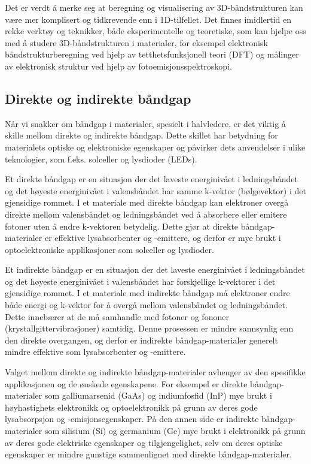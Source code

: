 Det er verdt å merke seg at beregning og visualisering av 3D-båndstrukturen kan være mer komplisert og tidkrevende enn i 1D-tilfellet. Det finnes imidlertid en rekke verktøy og teknikker, både eksperimentelle og teoretiske, som kan hjelpe oss med å studere 3D-båndstrukturen i materialer, for eksempel elektronisk båndstrukturberegning ved hjelp av tetthetsfunksjonell teori (DFT) og målinger av elektronisk struktur ved hjelp av fotoemisjonsspektroskopi.

\subsection*{Direkte og indirekte båndgap}

Når vi snakker om båndgap i materialer, spesielt i halvledere, er det viktig å skille mellom direkte og indirekte båndgap. Dette skillet har betydning for materialets optiske og elektroniske egenskaper og påvirker dets anvendelser i ulike teknologier, som f.eks. solceller og lysdioder (LEDs).

Et direkte båndgap er en situasjon der det laveste energinivået i ledningsbåndet og det høyeste energinivået i valensbåndet har samme k-vektor (bølgevektor) i det gjensidige rommet. I et materiale med direkte båndgap kan elektroner overgå direkte mellom valensbåndet og ledningsbåndet ved å absorbere eller emitere fotoner uten å endre k-vektoren betydelig. Dette gjør at direkte båndgap-materialer er effektive lysabsorbenter og -emittere, og derfor er mye brukt i optoelektroniske applikasjoner som solceller og lysdioder.

Et indirekte båndgap er en situasjon der det laveste energinivået i ledningsbåndet og det høyeste energinivået i valensbåndet har forskjellige k-vektorer i det gjensidige rommet. I et materiale med indirekte båndgap må elektroner endre både energi og k-vektor for å overgå mellom valensbåndet og ledningsbåndet. Dette innebærer at de må samhandle med fotoner og fononer (krystallgittervibrasjoner) samtidig. Denne prosessen er mindre sannsynlig enn den direkte overgangen, og derfor er indirekte båndgap-materialer generelt mindre effektive som lysabsorbenter og -emittere.

Valget mellom direkte og indirekte båndgap-materialer avhenger av den spesifikke applikasjonen og de ønskede egenskapene. For eksempel er direkte båndgap-materialer som galliumarsenid (GaAs) og indiumfosfid (InP) mye brukt i høyhastighets elektronikk og optoelektronikk på grunn av deres gode lysabsorpsjon og -emisjonsegenskaper. På den annen side er indirekte båndgap-materialer som silisium (Si) og germanium (Ge) mye brukt i elektronikk på grunn av deres gode elektriske egenskaper og tilgjengelighet, selv om deres optiske egenskaper er mindre gunstige sammenlignet med direkte båndgap-materialer.

